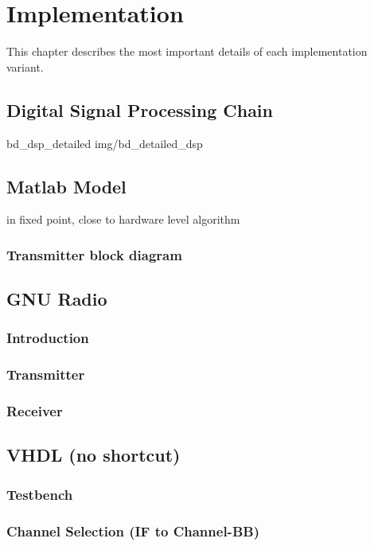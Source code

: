 \chapter{Implementation}
\label{cha:Implementation}

This chapter describes the most important details of each implementation variant.

\section{Digital Signal Processing Chain}

 {bd_dsp_detailed} {img/bd_detailed_dsp}

\section{Matlab Model}

in fixed point, close to hardware level algorithm

\subsection{Transmitter block diagram}

\section{GNU Radio}
  \subsection{Introduction}
  \subsection{Transmitter}
  \subsection{Receiver}

\section{VHDL (no shortcut)}
  \subsection{Testbench}
  \subsection{Channel Selection (IF to Channel-BB)}
